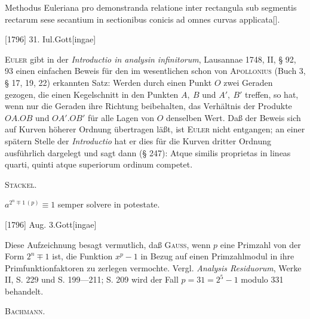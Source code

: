 \indent Methodus Euleriana pro demonstranda relatione inter rectangula sub segmentis rectarum sese secantium in sectionibus conicis ad omnes curvas applicata[\footnotemark].
\begingroup\renewcommand{\thefootnote}{[*)}\footnotetext{In der Handschrift steht \textls[120]{applicatum}.]}\endgroup
\par\noindent\hfill[1796] 31. Iul.\quad Gott[ingae]

\medskip\begingroup\small
\indent \textsc{Euler} gibt in der \textit{Introductio in analysin infinitorum}, Lausannae 1748, II, § 92, 93 einen einfachen Beweis für den im wesentlichen schon von \textsc{Apollonius} (Buch 3, § 17, 19, 22) erkannten Satz: Werden durch einen Punkt \(O\) zwei Geraden gezogen, die einen Kegelschnitt in den Punkten \(A,\ B\) und \(A',\ B'\) treffen, so hat, wenn nur die Geraden ihre Richtung beibehalten, das Verhältnis der Produkte \(OA.OB\) und \(OA'.OB'\) für alle Lagen von \(O\) denselben Wert. Daß der Beweis sich auf Kurven höherer Ordnung übertragen läßt, ist \textsc{Euler} nicht entgangen; an einer spätern Stelle der \textit{Introductio} hat er dies für die Kurven dritter Ordnung ausführlich dargelegt und sagt dann (§ 247): Atque similis proprietas in lineas quarti, quinti atque superiorum ordinum competet.
\par\noindent\hfill\textsc{Stäckel.}
\par\endgroup

\indent \(a^{2^n\mp1\,(p)}\equiv1\) semper solvere in potestate.
\par\noindent\hfill[1796] Aug. 3.\quad Gott[ingae]

\medskip\begingroup\small
\indent Diese Aufzeichnung besagt vermutlich, daß \textsc{Gauss}, wenn \(p\) eine Primzahl von der Form \(2^n\mp1\) ist, die Funktion \(x^p-1\) in Bezug auf einen Primzahlmodul in ihre Primfunktionfaktoren zu zerlegen vermochte. Vergl. \textit{Analysis Residuorum}, Werke II, S. 229 und S. 199—211; S. 209 wird der Fall \(p=31=2^5-1\) modulo 331 behandelt.
\par\noindent\hfill\textsc{Bachmann.}
\par\endgroup

